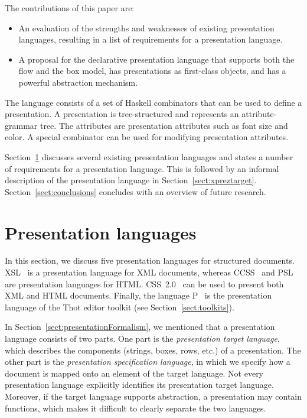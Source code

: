 \begin{center}
 \qquad
{}
\end{center}


\bc
The contributions of this paper are:

\begin{itemize}
\item An evaluation of the strengths and weaknesses of existing presentation languages, resulting in a list of requirements for a presentation language.
\item A proposal for the declarative presentation language {\Xprez} that supports both the flow and the box model, has presentations as first-class objects, and has a powerful abstraction mechanism.
\end{itemize}
\ec

The {\Xprez} language consists of a set of Haskell combinators that can be used to define a presentation. A presentation is tree-structured and represents an attribute-grammar tree. The attributes are presentation attributes such as font size and color. A special combinator can be used for modifying presentation attributes. 

Section~\ref{sect:targetlangs} discusses several existing presentation languages and states a number of requirements for a presentation language. This is followed by an informal description of the {\Xprez} presentation language in Section~\ref{sect:xpreztarget}. Section~\ref{sect:conclusions} concludes with an overview of future research.


%																
%																
%																
\section{Presentation languages} \label{sect:targetlangs}

In this section, we discuss five presentation languages for structured documents. XSL~\cite{xsl10} is a presentation language for XML documents, whereas CCSS~\cite{badros99ccss} and PSL~\cite{marden98psl} are presentation languages for HTML. CSS~2.0~\cite{css2} can be used to present both XML and HTML documents. Finally, the language P~\cite{quint97thot} is the presentation language of the Thot editor toolkit (see Section~\ref{sect:toolkits}). 

In Section~\ref{sect:presentationFormalism}, we mentioned that a presentation language consists of two parts. One part is the {\em presentation target language}, which describes the components (strings, boxes, rows, etc.) of a presentation. The other part is the {\em presentation specification language}, in which we specify how a document is mapped onto an element of the target language. Not every presentation language explicitly identifies its presentation target language. Moreover, if the target language supports abstraction, a presentation may contain functions, which makes it difficult to clearly separate the two languages.

